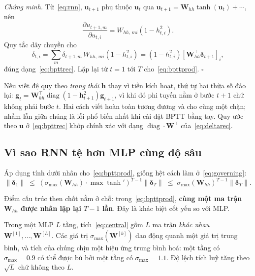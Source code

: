 \noindent\textit{Chứng minh.}\;
Từ~\eqref{eq:rnn}, $\mathbf{u}_{t+1}$ phụ thuộc $\mathbf{u}_t$ qua
$\mathbf{u}_{t+1} = \mathbf{W}_{hh}\tanh(\mathbf{u}_t) + \cdots$, nên
\[
  \frac{\partial u_{t+1,m}}{\partial u_{t,i}}
  = W_{hh,\,mi}\left(1 - h_{t,i}^2\right).
\]
Quy tắc dây chuyền cho
\[
  \delta_{t,i}
  = \sum_m \delta_{t+1,m}\,W_{hh,\,mi}\left(1-h_{t,i}^2\right)
  = \left(1-h_{t,i}^2\right)\left[\mathbf{W}_{hh}^{\top}\boldsymbol{\delta}_{t+1}\right]_i ,
\]
đúng dạng~\eqref{eq:bpttrec}. Lặp lại từ $t=1$ tới $T$ cho~\eqref{eq:bpttprod}.
\hfill$\square$

\begin{notebox}
Nếu viết đệ quy theo \emph{trạng thái} $\mathbf{h}$ thay vì tiền kích hoạt, thứ
tự hai thừa số đảo lại:
$\mathbf{g}_t = \mathbf{W}_{hh}^{\top}\operatorname{diag}\!\left(1-\mathbf{h}_{t+1}^2\right)\mathbf{g}_{t+1}$,
vì khi đó phi tuyến nằm ở bước $t+1$ chứ không phải bước $t$. Hai cách viết hoàn
toàn tương đương và cho cùng một chặn; nhầm lẫn giữa chúng là lỗi phổ biến nhất
khi cài đặt BPTT bằng tay. Quy ước theo $\mathbf{u}$ ở~\eqref{eq:bpttrec} khớp
chính xác với dạng $\operatorname{diag}\cdot\mathbf{W}^{\top}$
của~\eqref{eq:deltarec}.
\end{notebox}

\subsection{Vì sao RNN tệ hơn MLP cùng độ sâu}

Áp dụng tính dưới nhân cho~\eqref{eq:bpttprod}, giống hệt cách làm
ở~\eqref{eq:governing}:
\begin{equation}
  \left\|\boldsymbol{\delta}_1\right\|
  \;\le\;
  \left(\sigma_{\max}\!\left(\mathbf{W}_{hh}\right)\cdot\max\tanh'\right)^{T-1}
  \left\|\boldsymbol{\delta}_T\right\|
  \;\le\;
  \sigma_{\max}\!\left(\mathbf{W}_{hh}\right)^{T-1}\left\|\boldsymbol{\delta}_T\right\| .
  \label{eq:bpttbound}
\end{equation}

Điểm cấu trúc then chốt nằm ở chỗ: trong~\eqref{eq:bpttprod}, \textbf{cùng một ma
trận $\mathbf{W}_{hh}$ được nhân lặp lại $T-1$ lần}. Đây là khác biệt cốt yếu so
với MLP.

Trong một MLP $L$ tầng, tích~\eqref{eq:central} gồm $L$ ma trận \emph{khác nhau}
$\mathbf{W}^{[1]},\dots,\mathbf{W}^{[L]}$. Các giá trị
$\sigma_{\max}(\mathbf{W}^{[k]})$ dao động quanh một giá trị trung bình, và tích
của chúng chịu một hiệu ứng trung bình hoá: một tầng có
$\sigma_{\max} = 0.9$ có thể được bù bởi một tầng có $\sigma_{\max} = 1.1$. Độ
lệch tích luỹ tăng theo $\sqrt{L}$ chứ không theo $L$.

